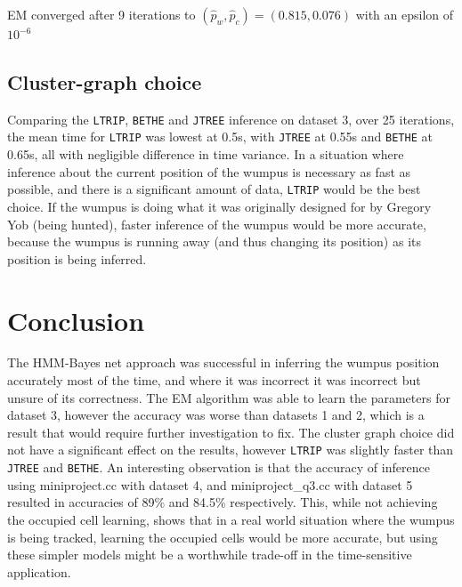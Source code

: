 \documentclass[11pt, a4paper]{article}
\begin{document}
EM converged after 9 iterations to $(\hat p_w, \hat p_c) = (0.815,
0.076)$ with an epsilon of $10^{-6}$

\subsection{Cluster-graph choice}

Comparing the \texttt{LTRIP}, \texttt{BETHE} and \texttt{JTREE} inference on dataset 3,
over 25 iterations, the mean time for \texttt{LTRIP} was lowest at 0.5s, with \texttt{JTREE} at 0.55s and \texttt{BETHE} at
0.65s, all with negligible difference in time variance. In a situation where inference about the current position of the wumpus
is necessary as fast as possible, and there is a significant amount of data, \texttt{LTRIP} would be the best choice. 
If the wumpus is doing what it was originally designed for by Gregory Yob (being hunted),
faster inference of the wumpus would be more accurate, because the wumpus is running away (and thus changing its position) as its position is being
inferred. 


\section{Conclusion}

The HMM-Bayes net approach was successful in inferring the wumpus position accurately most of the time, and where
it was incorrect it was incorrect but unsure of its correctness. The EM algorithm was able to learn the parameters
for dataset 3, however the accuracy was worse than datasets 1 and 2, which is a result that would require further investigation to fix.
The cluster graph choice did not have a significant effect on the results, however \texttt{LTRIP} was slightly faster than
\texttt{JTREE} and \texttt{BETHE}. An interesting observation is that the accuracy of inference using miniproject.cc with dataset 4, 
and miniproject\_q3.cc with dataset 5 resulted in accuracies of 89\% and 84.5\% respectively. This, while not achieving the occupied cell
learning, shows that in a real world situation where the wumpus is being tracked, learning the occupied cells would be more accurate, but using
these simpler models might be a worthwhile trade-off in the time-sensitive application.



\end{document}
